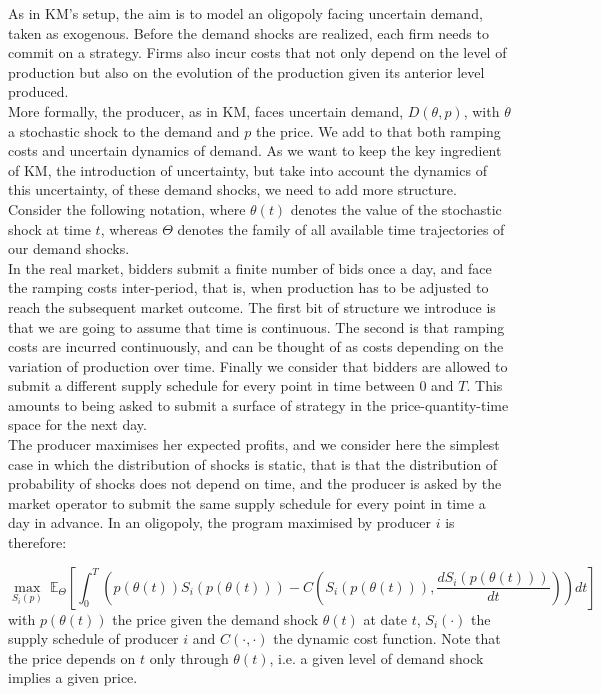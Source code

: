 As in KM's setup, the aim is to model an oligopoly facing uncertain demand, taken as exogenous. Before the demand shocks are realized, each firm needs to commit on a strategy. Firms also incur costs that not only depend on the level of production but also on the evolution of the production given its anterior level produced. \\

More formally, the producer, as in KM, faces uncertain demand, $D(\theta,p)$, with $\theta$ a stochastic shock to the demand and $p$ the price. We add to that both ramping costs and uncertain dynamics of demand. As we want to keep the key ingredient of KM, the introduction of uncertainty, but take into account the dynamics of this uncertainty, of these demand shocks, we need to add more structure.\\

Consider the following notation, where $\theta(t)$ denotes the value of the stochastic shock at time $t$, whereas $\Theta$ denotes the family of all available time trajectories of our demand shocks. \\

In the real market, bidders submit a finite number of bids once a day, and face the ramping costs inter-period, that is, when production has to be adjusted to reach the subsequent market outcome. The first bit of structure we introduce is that we are going to assume that time is continuous. The second is that ramping costs are incurred continuously, and can be thought of as costs depending on the variation of production over time. Finally we consider that bidders are allowed to submit a different supply schedule for every point in time between $0$ and $T$. This amounts to being asked to submit a surface of strategy in the price-quantity-time space for the next day. \\

The producer maximises her expected profits, and we consider here the simplest case in which the distribution of shocks is static, that is that the distribution of probability of shocks does not depend on time, and the producer is asked by the market operator to submit the same supply schedule for every point in time a day in advance. In an oligopoly, the program maximised by producer $i$ is therefore:

\begin{equation}
\displaystyle{\max_{S_i(p)}}~\mathbb{E}_{\Theta}\left[\int_{0}^{T} \left(p(\theta(t))S_i(p(\theta(t))) -C\left(S_i(p(\theta(t))),\frac{dS_i(p(\theta(t)))}{dt} \right)\right)dt\right]
\end{equation}
with $p(\theta(t))$ the price given the demand shock $\theta(t)$ at date $t$, $S_i(\cdot)$ the supply schedule of producer $i$ and $C(\cdot,\cdot)$ the dynamic cost function. Note that the price depends on $t$ only through $\theta(t)$, i.e. a given level of demand shock implies a given price.  \\

